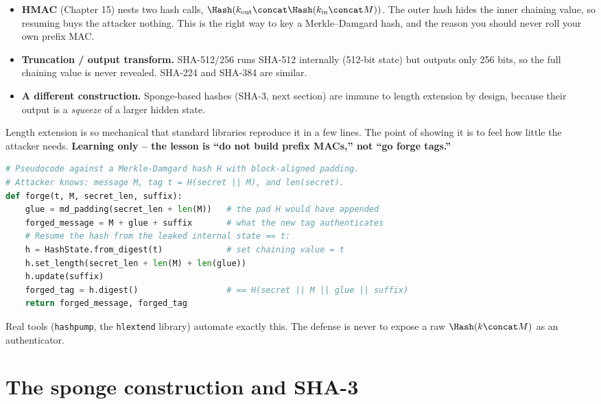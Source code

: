 \begin{itemize}
  \item \textbf{HMAC} (Chapter 15) nests two hash calls, $\Hash(k_{\text{out}} \concat \Hash(k_{\text{in}} \concat M))$. The outer hash hides the inner chaining value, so resuming buys the attacker nothing. This is the right way to key a Merkle--Damgard hash, and the reason you should never roll your own prefix MAC.
  \item \textbf{Truncation / output transform.} SHA-512/256 runs SHA-512 internally (512-bit state) but outputs only 256 bits, so the full chaining value is never revealed. SHA-224 and SHA-384 are similar.
  \item \textbf{A different construction.} Sponge-based hashes (SHA-3, next section) are immune to length extension by design, because their output is a \emph{squeeze} of a larger hidden state.
\end{itemize}

\begin{implementbox}
Length extension is so mechanical that standard libraries reproduce it in a few lines. The point of showing it is to feel how little the attacker needs. \textbf{Learning only -- the lesson is ``do not build prefix MACs,'' not ``go forge tags.''}
\begin{lstlisting}[language=Python]
# Pseudocode against a Merkle-Damgard hash H with block-aligned padding.
# Attacker knows: message M, tag t = H(secret || M), and len(secret).
def forge(t, M, secret_len, suffix):
    glue = md_padding(secret_len + len(M))   # the pad H would have appended
    forged_message = M + glue + suffix       # what the new tag authenticates
    # Resume the hash from the leaked internal state == t:
    h = HashState.from_digest(t)             # set chaining value = t
    h.set_length(secret_len + len(M) + len(glue))
    h.update(suffix)
    forged_tag = h.digest()                  # == H(secret || M || glue || suffix)
    return forged_message, forged_tag
\end{lstlisting}
Real tools (\texttt{hashpump}, the \texttt{hlextend} library) automate exactly this. The defense is never to expose a raw $\Hash(k \concat M)$ as an authenticator.
\end{implementbox}

\section{The sponge construction and SHA-3}
\label{ch14:sponge}

